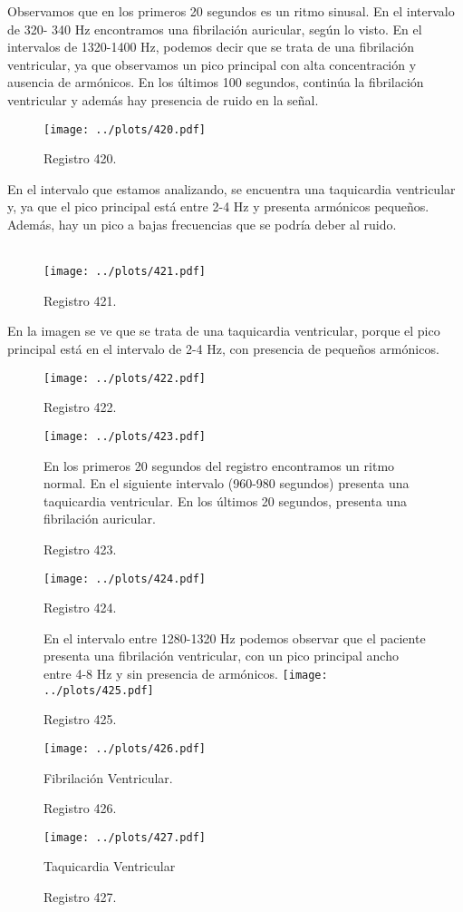 \documentclass{article}
\begin{document}
Observamos que en los primeros 20 segundos es un ritmo sinusal. En el
intervalo de 320- 340 Hz encontramos una fibrilación auricular, según
lo visto. En el intervalos de 1320-1400 Hz, podemos decir que se trata
de una fibrilación ventricular, ya que observamos un pico principal
con alta concentración y ausencia de armónicos. En los últimos 100
segundos, continúa la fibrilación ventricular y además hay presencia
de ruido en la señal.
\newpage

\begin{figure}[h]
\centering
\texttt{[image: ../plots/420.pdf]}
\caption{Registro 420.}
\end{figure}

En el intervalo que estamos analizando, se encuentra una taquicardia
ventricular y, ya que el pico principal está entre 2-4 Hz y presenta
armónicos pequeños. Además, hay un pico a bajas frecuencias que se
podría deber al ruido.
\\\\

\begin{figure}[h]
\centering
\texttt{[image: ../plots/421.pdf]}
\caption{Registro 421.}
\end{figure}

En la imagen se ve que se trata de una taquicardia ventricular, porque
el pico principal está en el intervalo de 2-4 Hz, con presencia de
pequeños armónicos.

\newpage

\begin{figure}[h]
\centering
\texttt{[image: ../plots/422.pdf]}
\vspace{-1cm}
\caption{Registro 422.}
\texttt{[image: ../plots/423.pdf]}
\vspace{-2cm}
\caption{Registro 423.}
En los primeros 20 segundos del registro encontramos  un ritmo normal.
En el siguiente intervalo (960-980 segundos) presenta una taquicardia
ventricular. En los últimos 20 segundos, presenta una fibrilación
auricular.
\end{figure}

\newpage
\begin{figure}[h]
\begin{center}
\texttt{[image: ../plots/424.pdf]}
\end{center}
\vspace{-1cm}
\caption{Registro 424.}
\quad En el intervalo entre 1280-1320 Hz podemos observar que el paciente
presenta una fibrilación ventricular, con un pico principal ancho
entre 4-8 Hz y sin presencia de armónicos.
\texttt{[image: ../plots/425.pdf]}
\vspace{-2cm}
\caption{Registro 425.}
\end{figure}

\newpage

\begin{figure}[h]
\texttt{[image: ../plots/426.pdf]}
\caption{Registro 426.}
\quad Fibrilación Ventricular.
\end{figure}

\begin{figure}[h]
\texttt{[image: ../plots/427.pdf]}
\caption{Registro 427.}
\quad Taquicardia Ventricular
\end{figure}
\end{document}
